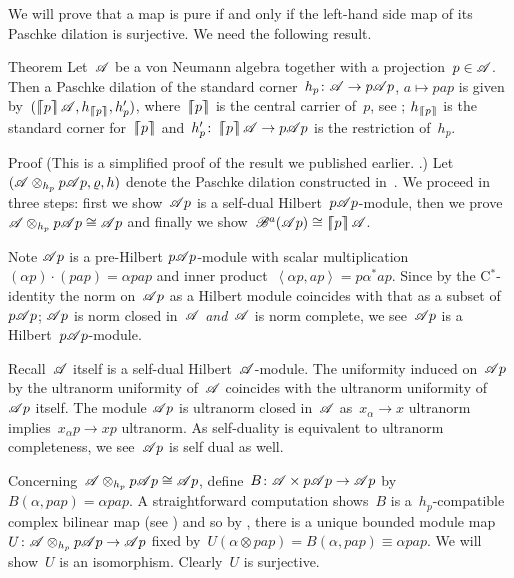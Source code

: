 \documentclass[b]{subfiles}
\begin{document}
\begin{parsec}%
\begin{point}%
We will prove that a map is pure if and only if
    the left-hand side map of its Paschke dilation
    is surjective.  We need the following result.
\end{point}
\begin{point}{Theorem}%
Let~$\mathscr{A}$ be a von Neumann algebra together with a projection~$p \in \mathscr{A}$.
Then a Paschke dilation of the standard corner~$h_p \colon \mathscr{A} \to p\mathscr{A} p$,
$a \mapsto pap$
is given by~$(\cceil{p}\scrA, h_{\cceil{p}}, h'_p)$,
    where~$\left\lceil\!\!\left\lceil p\right\rceil\!\!\right\rceil$ is the central  carrier of~$p$,
    see ;
    $h_{\left\lceil\!\!\left\lceil p\right\rceil\!\!\right\rceil}$ is the standard corner for~$\left\lceil\!\!\left\lceil p\right\rceil\!\!\right\rceil$
        and~$h'_p \colon \left\lceil\!\!\left\lceil p\right\rceil\!\!\right\rceil \mathscr{A} \to p\mathscr{A} p$
        is the restriction of~$h_p$.
\begin{point}{Proof}%
(This is a simplified proof of the result we published earlier.
    \cite[Thm.~28]{wwpaschke}.)
Let~$(\mathscr{A} \otimes_{h_p} p\mathscr{A} p, \varrho, h)$
    denote the Paschke dilation constructed in~.
We proceed in three steps:
    first we show~$\mathscr{A} p$ is a self-dual Hilbert~$p\mathscr{A} p$-module,
    then we prove~$\mathscr{A} \otimes_{h_p} p\mathscr{A} p \cong \mathscr{A} p$
    and finally we show~$\mathscr{B}^a(\mathscr{A} p) \cong \left\lceil\!\!\left\lceil p\right\rceil\!\!\right\rceil \mathscr{A}$.
\begin{point}%
Note $\mathscr{A} p$ is a pre-Hilbert $p \mathscr{A} p$-module
    with scalar multiplication~$(\alpha p)\cdot (pap) = \alpha pap$
    and inner product~$\left<\alpha p, ap\right> = p\alpha^*ap$.
Since by the C$^*$-identity the norm on~$\mathscr{A} p$
    as a Hilbert module coincides with that as a subset of~$p \mathscr{A} p$;
    $\mathscr{A} p$ is norm closed in~$\mathscr{A}$ \emph{and}~$\mathscr{A}$ is norm complete,
    we see~$\mathscr{A} p$ is a Hilbert~$p \mathscr{A} p$-module.

Recall~$\mathscr{A}$ itself is a self-dual Hilbert~$\mathscr{A}$-module.
The uniformity induced on~$\mathscr{A} p$ by the ultranorm uniformity
    of~$\mathscr{A}$ coincides with the ultranorm uniformity of~$\mathscr{A} p$ itself.
The module $\mathscr{A} p$ is ultranorm closed in~$\mathscr{A}$
    as~$x_\alpha \to x$ ultranorm
    implies~$x_\alpha p \to xp$ ultranorm.
As self-duality is equivalent to ultranorm completeness,
    we see~$\mathscr{A} p$ is self dual as well.
\end{point}
\begin{point}%
Concerning~$\mathscr{A} \otimes_{h_p} p \mathscr{A} p \cong \mathscr{A} p$,
    define~$B\colon \mathscr{A} \times  p \mathscr{A} p \to \mathscr{A} p$
    by~$B(\alpha, pap) = \alpha pap$.
A straightforward computation
    shows~$B$ is a~$h_p$-compatible complex bilinear map
    (see )
    and so by ,  there is a unique bounded module
    map~$U \colon \mathscr{A} \otimes_{h_p} p \mathscr{A} p \to \mathscr{A} p$
    fixed by~$U (\alpha \otimes pap) = B(\alpha,pap) \equiv \alpha pap $.
We will show~$U$ is an isomorphism.
   Clearly~$U$ is surjective.


\end{point}
\end{point}
\end{point}
\end{parsec}
\end{document}
